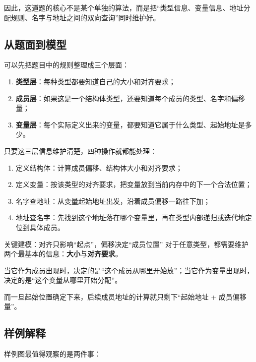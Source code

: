 \documentclass{book}
\begin{document}
因此，这道题的核心不是某个单独的算法，而是把“类型信息、变量信息、地址分配规则、名字与地址之间的双向查询”同时维护好。

\subsection{从题面到模型}

可以先把题目中的规则整理成三个层面：

\begin{enumerate}[leftmargin=2em,itemsep=1pt,topsep=2pt,parsep=0pt,partopsep=0pt]
    \item \textbf{类型层}：每种类型都要知道自己的大小和对齐要求；
    \item \textbf{成员层}：如果这是一个结构体类型，还要知道每个成员的类型、名字和偏移量；
    \item \textbf{变量层}：每个实际定义出来的变量，都要知道它属于什么类型、起始地址是多少。
\end{enumerate}

只要这三层信息维护清楚，四种操作就都能处理：

\begin{enumerate}[leftmargin=2em,itemsep=1pt,topsep=2pt,parsep=0pt,partopsep=0pt]
    \item 定义结构体：计算成员偏移、结构体大小和对齐要求；
    \item 定义变量：按该类型的对齐要求，把变量放到当前内存中的下一个合法位置；
    \item 名字查地址：从变量起始地址出发，沿着成员偏移一路往下加；
    \item 地址查名字：先找到这个地址落在哪个变量里，再在类型内部递归或迭代地定位到具体成员。
\end{enumerate}

    \begin{keybox}{关键建模：对齐只影响“起点”，偏移决定“成员位置”}
        对于任意类型，都需要维护两个最基本的信息：\textbf{大小}与\textbf{对齐要求}。

        当它作为成员出现时，决定的是“这个成员从哪里开始放”；当它作为变量出现时，决定的是“这个变量从哪里开始分配”。

        而一旦起始位置确定下来，后续成员地址的计算就只剩下“起始地址 + 成员偏移量”。
    \end{keybox}

\newpage
\subsection{样例解释}
    样例图最值得观察的是两件事：
\end{document}
